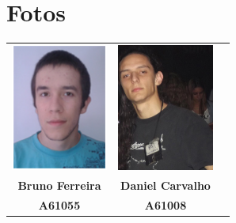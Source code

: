 \documentclass[a5paper,twocolumn, 11pt]{article}
\begin{document}
\section{Fotos}
\begin{center}
    \begin{tabular}{ccc}
        \includegraphics[width=90pt]{bruno.png}&
        \includegraphics[width=90pt]{daniel.png}\\
        
        \small{\textbf{Bruno Ferreira}}&
        \small{\textbf{Daniel Carvalho}}\\
        \small{\textbf{A61055}}&
        \small{\textbf{A61008}}\\
    \end{tabular}
\end{center}
\end{document}
